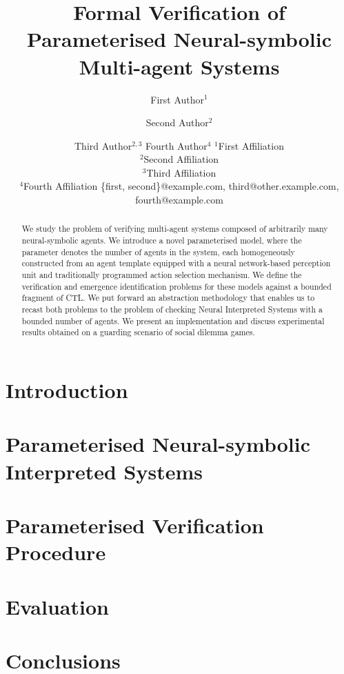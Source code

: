 \documentclass{article}
\title{Formal Verification of  Parameterised Neural-symbolic Multi-agent Systems}
\author{
}
\author{
First Author$^1$
\and
Second Author$^2$\and
Third Author$^{2,3}$\And
Fourth Author$^4$
\affiliations
$^1$First Affiliation\\
$^2$Second Affiliation\\
$^3$Third Affiliation\\
$^4$Fourth Affiliation
\emails
\{first, second\}@example.com,
third@other.example.com,
fourth@example.com
}
\begin{document}
\maketitle

\begin{abstract}

We study the problem of verifying multi-agent systems composed of arbitrarily
many neural-symbolic agents. We introduce a novel parameterised model, where the
parameter denotes the number of agents in the system, each homogeneously
constructed from an agent template equipped with a neural network-based
perception unit  and traditionally programmed action selection mechanism. We
define the verification and emergence identification problems for these models
against a bounded fragment of CTL. We put forward an abstraction methodology
that enables us to recast both problems to the problem of checking Neural
Interpreted Systems with a bounded number of agents. We present an
implementation and discuss experimental results obtained on a guarding scenario
of social dilemma games.

\end{abstract}

\section{Introduction}
\label{sec:intro}


\section{Parameterised Neural-symbolic Interpreted Systems}
\label{sec:pnis}


\section{Parameterised Verification Procedure}
\label{sec:verification}


\section{Evaluation}
\label{sec:eval}


\section{Conclusions}
\label{sec:conclusions}


% 






\end{document}
